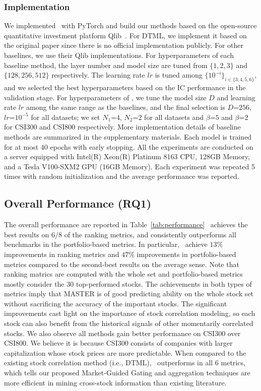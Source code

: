 \subsubsection{Implementation}
We implemented ~with PyTorch and build our methods based on the open-source quantitative investment platform Qlib~\cite{yang2020qlib}. For DTML, we implement it based on the original paper since there is no official implementation publicly. For other baselines, we use their Qlib implementations.
For hyperparameters of each baseline method, the layer number and model size are tuned from $\{1,2,3\}$ and $\{128, 256, 512\}$ respectively. The learning rate $lr$ is tuned among $\{10^{-i}\}_{i\in\{3,4,5,6\}}$, and we selected the best hyperparameters based on the IC performance in the validation stage.
For hyperparameters of \frameworkname, we tune the model size $D$ and learning rate $lr$ among the same range as the baselines, and the final selection is $D$=$256$, $lr$=$10^{-5}$ for all datasets; we set $N_1$=$4$, $N_2$=$2$ for all datasets and $\beta$=$5$ and $\beta$=$2$ for CSI300 and CSI800 respectively. More implementation details of baseline methods are summarized in the supplementary materials.
Each model is trained for at most $40$ epochs with early stopping.
All the experiments are conducted on a server equipped with Intel(R) Xeon(R) Platinum 8163 CPU, 128GB Memory, and a Tesla V100-SXM2 GPU (16GB Memory). 
Each experiment was repeated 5 times with random initialization and the average performance was reported.

\subsection{Overall Performance (RQ1)}
\label{sec:interval}
The overall performance are reported in Table~\ref{tab:performance} %
\frameworkname~achieves the best results on 6/8 of the ranking metrics, and 
consistently outperforms all benchmarks in the portfolio-based metrics. In particular, \frameworkname~achieve $13\%$ improvements in ranking metrics and $47\%$ improvements in portfolio-based metrics compared to the second-best results on the average sense. Note that ranking matrics are computed with the whole set and portfolio-based metrics mostly consider the 30 top-performed stocks. 
The achievements in both types of metrics imply that MASTER is of good predicting ability on the whole stock set without sacrificing the accuracy of the important stocks. 
The significant improvements cast light on the importance of stock correlation modeling, so each stock can also benefit from the historical signals of other momentarily correlated stocks. 
We also observe all methods gain better performance on CSI300 over CSI800. We believe it is because CSI300 consists of companies with larger capitalization whose stock prices are more predictable. 
When compared to the existing stock correlation method (i.e., DTML), \frameworkname~outperforms in all 6 metrics, which tells our proposed Market-Guided Gating and aggregation techniques are more efficient in mining cross-stock information than existing literature. 

